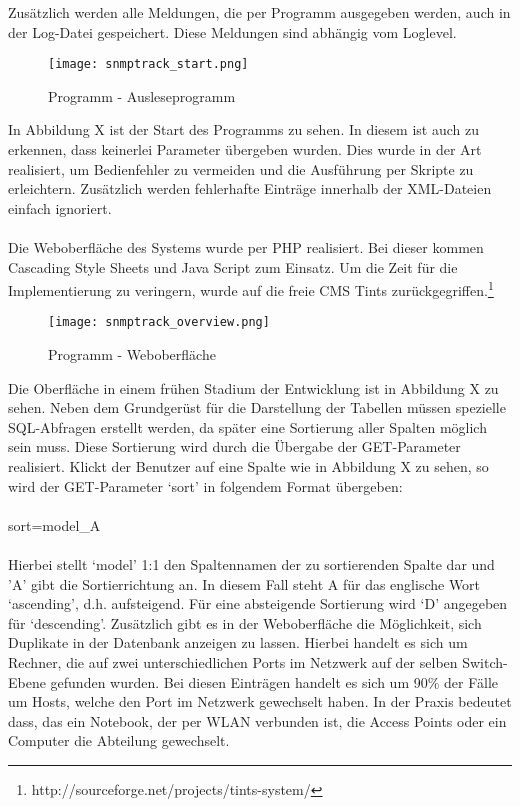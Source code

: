 Zusätzlich werden alle Meldungen, die per Programm ausgegeben werden, auch in der Log-Datei gespeichert.
Diese Meldungen sind abhängig vom Loglevel.
\\
\begin{figure}[H]
\centering
\texttt{[image: snmptrack\_start.png]}
\caption{Programm - Ausleseprogramm}
\label{fig:show_s1_s2_p1_n1}
\end{figure}
In Abbildung X ist der Start des Programms zu sehen. In diesem ist auch zu erkennen, dass keinerlei Parameter übergeben wurden. Dies wurde in der Art realisiert, um Bedienfehler zu vermeiden und die Ausführung per Skripte zu erleichtern.
Zusätzlich werden fehlerhafte Einträge innerhalb der XML-Dateien einfach ignoriert.\\\\
Die Weboberfläche des Systems wurde per PHP realisiert.
Bei dieser kommen Cascading Style Sheets und Java Script zum Einsatz.
Um die Zeit für die Implementierung zu veringern, wurde auf die freie CMS Tints zurückgegriffen.\footnote{http://sourceforge.net/projects/tints-system/}
\\
\begin{figure}[H]
\centering
\texttt{[image: snmptrack\_overview.png]}
\caption{Programm - Weboberfläche}
\label{fig:show_s1_s2_p1_n1}
\end{figure}
Die Oberfläche in einem frühen Stadium der Entwicklung ist in Abbildung X zu sehen.
Neben dem Grundgerüst für die Darstellung der Tabellen müssen spezielle SQL-Abfragen erstellt werden, da später eine Sortierung aller Spalten möglich sein muss.
Diese Sortierung wird durch die Übergabe der GET-Parameter realisiert. Klickt der Benutzer auf eine Spalte wie in Abbildung X zu sehen, so wird der GET-Parameter ‘sort’ in folgendem Format übergeben:\\
\\
sort=model\_A\\
\\
Hierbei stellt ‘model’ 1:1 den Spaltennamen der zu sortierenden Spalte dar und 'A' gibt die Sortierrichtung an. In diesem Fall steht A für das englische Wort ‘ascending’, d.h. aufsteigend. Für eine absteigende Sortierung wird ‘D’ angegeben für ‘descending’.
Zusätzlich gibt es in der Weboberfläche die Möglichkeit, sich Duplikate in der Datenbank anzeigen zu lassen.
Hierbei handelt es sich um Rechner, die auf zwei unterschiedlichen Ports im Netzwerk auf der selben Switch-Ebene gefunden wurden.
Bei diesen Einträgen handelt es sich um 90\% der Fälle um Hosts, welche den Port im Netzwerk gewechselt haben.
In der Praxis bedeutet dass, das ein Notebook, der per WLAN verbunden ist, die Access Points oder ein Computer die Abteilung gewechselt.

